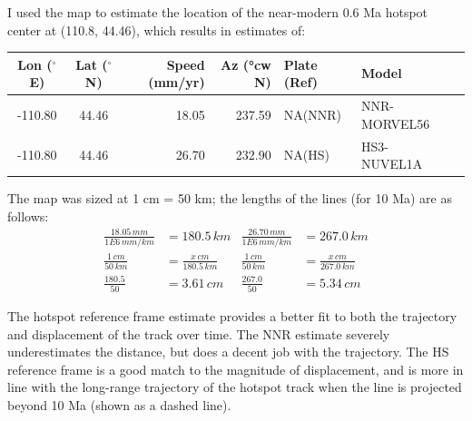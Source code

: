\documentclass{template}
\begin{document}
\begin{enumerate}[label=\textbf{\arabic*.}]
\begin{enumerate}[label=\Alph*)]
{            I used the map to estimate the location of the near-modern 0.6 Ma hotspot center at (110.8, 44.46), which results in estimates of:

            \begin{table}[H]
                \centering
                \small
                \begin{tabular}{ccrrlll}
                    \toprule
                    \textbf{Lon ($^\circ$E)} & \textbf{Lat ($^\circ$N)} & \textbf{Speed (mm/yr)} & \textbf{Az} (°cw N) & \textbf{Plate (Ref)} & \textbf{Model} \\
                    \midrule
                    -110.80 & 44.46 & 18.05 & 237.59 & NA(NNR) & NNR-MORVEL56 \\
                    -110.80 & 44.46 & 26.70 & 232.90 & NA(HS) & HS3-NUVEL1A  \\
                    \bottomrule
                \end{tabular}
            \end{table}

            The map was sized at 1 cm = 50 km; the lengths of the lines (for 10 Ma) are as follows:
            \begin{align*}
                \frac{18.05\,\unit{mm}}{1\unit{E}6\,\unit{mm/km}} &= 180.5\,\unit{km}
                &
                \frac{26.70\,\unit{mm}}{1\unit{E}6\,\unit{mm/km}} &= 267.0\,\unit{km} \\[1.5em]
                \frac{1\,\unit{cm}}{50\,\unit{km}} &= \frac{x\,\unit{cm}}{180.5\,\unit{km}}
                &
                \frac{1\,\unit{cm}}{50\,\unit{km}} &= \frac{x\,\unit{cm}}{267.0\,\unit{km}} \\[1.5em]
                \frac{180.5}{50} &= 3.61\,\unit{cm}
                &
                \frac{267.0}{50} &= 5.34\,\unit{cm}
            \end{align*}

            The hotspot reference frame estimate provides a better fit to both the trajectory and displacement of the track over time. The NNR estimate severely underestimates the distance, but does a decent job with the trajectory. The HS reference frame is a good match to the magnitude of displacement, and is more in line with the long-range trajectory of the hotspot track when the line is projected beyond 10 Ma (shown as a dashed line).
        }


\end{enumerate}
\end{enumerate}
\end{document}

